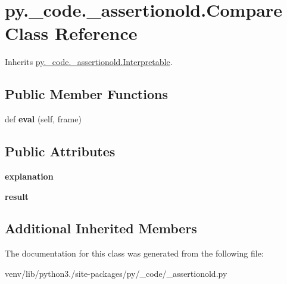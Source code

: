 \hypertarget{classpy_1_1__code_1_1__assertionold_1_1_compare}{}\section{py.\+\_\+code.\+\_\+assertionold.\+Compare Class Reference}
\label{classpy_1_1__code_1_1__assertionold_1_1_compare}


Inherits \hyperlink{classpy_1_1__code_1_1__assertionold_1_1_interpretable}{py.\+\_\+code.\+\_\+assertionold.\+Interpretable}.

\subsection*{Public Member Functions}
\begin{DoxyCompactItemize}
\item 
\mbox{\label{classpy_1_1__code_1_1__assertionold_1_1_compare_ae33995b66700ba0dae8a248e504e9a72}} 
def {\bfseries eval} (self, frame)
\end{DoxyCompactItemize}
\subsection*{Public Attributes}
\begin{DoxyCompactItemize}
\item 
\mbox{\label{classpy_1_1__code_1_1__assertionold_1_1_compare_a38dcc8c3127110844d2cba8922218eaf}} 
{\bfseries explanation}
\item 
\mbox{\label{classpy_1_1__code_1_1__assertionold_1_1_compare_a9ae86da89d7049e3027fe83d151dc3db}} 
{\bfseries result}
\end{DoxyCompactItemize}
\subsection*{Additional Inherited Members}


The documentation for this class was generated from the following file\+:\begin{DoxyCompactItemize}
\item 
venv/lib/python3./site-\/packages/py/\+\_\+code/\+\_\+assertionold.\+py\end{DoxyCompactItemize}
